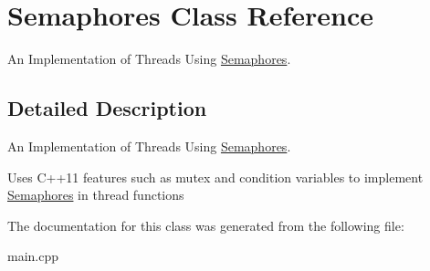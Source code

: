 \hypertarget{classSemaphores}{}\section{Semaphores Class Reference}
\label{classSemaphores}


An Implementation of Threads Using \hyperlink{classSemaphores}{Semaphores}.  




\subsection{Detailed Description}
An Implementation of Threads Using \hyperlink{classSemaphores}{Semaphores}. 

Uses C++11 features such as mutex and condition variables to implement \hyperlink{classSemaphores}{Semaphores} in thread functions 

The documentation for this class was generated from the following file\+:\begin{DoxyCompactItemize}
\item 
main.\+cpp\end{DoxyCompactItemize}
